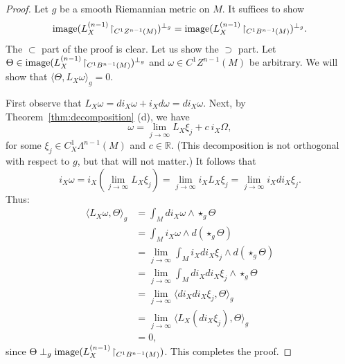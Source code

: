 \documentclass[11pt,letterpaper,reqno,abstract=true]{scrartcl}
\theoremstyle{plain}                              %
\theoremstyle{definition}                         %
\theoremstyle{remark}                             %
\newcommand{\R}{\mathbb{R}}                     %
\newcommand{\restrict}{\upharpoonright}
\begin{document}
\begin{proof}
  Let $g$ be a smooth Riemannian metric on $M$. It suffices to show
  \begin{displaymath}
    \text{\normalfont image}( L_X^{(n-1)} \! \restrict_{C^1
        Z^{n-1}(M)})^{\perp_g} = \text{\normalfont image}(
      L_X^{(n-1)} \! \restrict_{C^1 B^{n-1}(M)})^{\perp_g}.
    \end{displaymath}
    The $\subset$ part of the proof is clear. Let us show the
    $\supset$ part. Let $\Theta \in \text{\normalfont image}(
      L_X^{(n-1)} \! \restrict_{C^1 B^{n-1}(M)})^{\perp_g}$ and
      $\omega \in C^1 Z^{n-1}(M)$ be arbitrary. We will show that
      $\langle \Theta, L_X \omega \rangle_g = 0$.

      First observe that $L_X \omega = d i_X \omega  + i_X d\omega = d
      i_X \omega$. Next, by Theorem~\ref{thm:decomposition} (d), we
      have
      \begin{displaymath}
        \omega = \lim_{j \to \infty} L_X \xi_j + c \: i_X \Omega,
      \end{displaymath}
      for some $\xi_j \in C^1_X \Lambda^{n-1}(M)$ and
      $c \in \R$. (This decomposition is not orthogonal with
        respect to $g$, but that will not matter.) It follows that
      \begin{displaymath}
        i_X \omega = i_X (\lim_{j \to \infty} L_X \xi_j) = \lim_{j \to
          \infty} i_X L_X \xi_j = \lim_{j \to \infty} i_X d i_X \xi_j.
      \end{displaymath}
\nopagebreak      Thus:
      \begin{align*}
        \langle L_X \omega, \Theta \rangle_g & = \int_M d i_X \omega
                                               \wedge  \star_g \Theta \\
                                             & = \int_M i_X \omega
                                               \wedge d (\star_g \Theta) \\
        & = \lim_{j \to \infty} \int_M i_X d i_X \xi_j \wedge d (\star_g \Theta) \\
        & = \lim_{j \to \infty} \int_M d i_X d i_X \xi_j \wedge
          \star_g \Theta \\
        & = \lim_{j \to \infty} \langle d i_X d i_X \xi_j, \Theta
          \rangle_g \\
        & =  \lim_{j \to \infty} \langle L_X (d i_X \xi_j), \Theta
          \rangle_g \\
        & = 0,
      \end{align*}
      since $\Theta \perp_g \text{\normalfont image}(
      L_X^{(n-1)} \! \restrict_{C^1 B^{n-1}(M)})$. This completes the
      proof.
    \end{proof}
\end{document}
